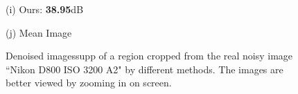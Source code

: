 \documentclass[10pt,onecolumn,letterpaper]{article}
\begin{document}
\begin{figure}[H]
{\begin{minipage}[t]{0.196\textwidth}
{\footnotesize (i) Ours: \textbf{38.95}dB  }
\end{minipage}
\begin{minipage}[t]{0.196\textwidth}
\centering
{}
{\footnotesize (j) Mean Image \cite{crosschannel2016} }
\end{minipage}
}
\caption{Denoised imagessupp of a region cropped from the real noisy image ``Nikon D800 ISO 3200 A2" \cite{crosschannel2016} by different methods. The images are better viewed by zooming in on screen.} 
\label{fig17}
\end{figure}


{\small


}
\end{document}
